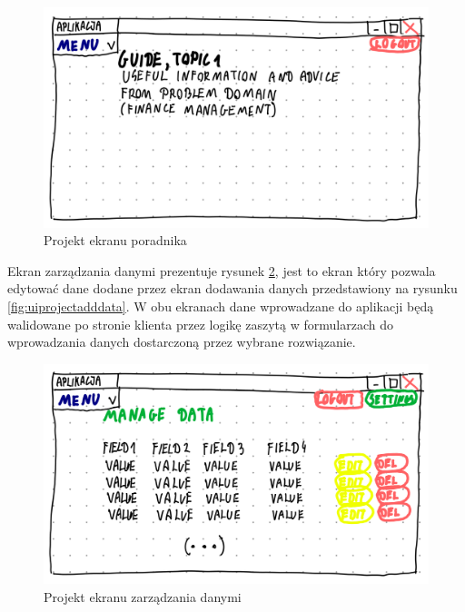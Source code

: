 \documentclass[a4paper, 10pt, twoside, openright]{report}
\begin{document}
\begin{large}
\begin{figure}[H]           %
    \centering
    \includegraphics[width=12cm]{figures/Righten_UI_sketch_guide.png}
    \caption{Projekt ekranu poradnika}
    \label{fig:uiprojectguide}
\end{figure}

{Ekran zarządzania danymi prezentuje rysunek \ref*{fig:uiprojectdatamanagement},
jest to ekran który pozwala edytować dane dodane przez ekran dodawania danych 
przedstawiony na rysunku \ref*{fig:uiprojectadddata}. W obu ekranach dane 
wprowadzane do aplikacji będą walidowane po stronie klienta przez logikę zaszytą
 w formularzach do wprowadzania danych dostarczoną przez wybrane rozwiązanie.}

\begin{figure}[H]           %
    \centering
    \includegraphics[width=12cm]{figures/Righten_UI_sketch_datamanagement.png}
    \caption{Projekt ekranu zarządzania danymi}
    \label{fig:uiprojectdatamanagement}
\end{figure}


\end{large}
\end{document}
